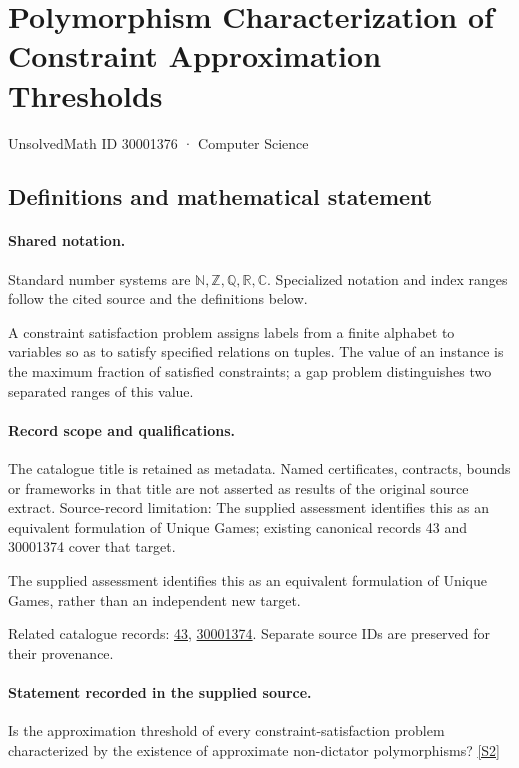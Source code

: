 \documentclass[11pt]{article}
\newcommand{\sref}[2]{\hyperlink{source:#1:#2}{[S#2]}}
\begin{document}
\setcounter{section}{30001375}
\section{Polymorphism Characterization of Constraint Approximation Thresholds}\label{30001376}
{\small\sffamily UnsolvedMath ID 30001376 · Computer Science}
\subsection{Definitions and mathematical statement}

\paragraph{Shared notation.}Standard number systems are $\mathbb N,\mathbb Z,\mathbb Q,\mathbb R,\mathbb C$. Specialized notation and index ranges follow the cited source and the definitions below.


A constraint satisfaction problem assigns labels from a finite alphabet to variables so as to satisfy specified relations on tuples. The value of an instance is the maximum fraction of satisfied constraints; a gap problem distinguishes two separated ranges of this value.
\paragraph{Record scope and qualifications.}
The catalogue title is retained as metadata. Named certificates, contracts, bounds or frameworks in that title are not asserted as results of the original source extract.
Source-record limitation: The supplied assessment identifies this as an equivalent formulation of Unique Games; existing canonical records 43 and 30001374 cover that target.

The supplied assessment identifies this as an equivalent formulation of Unique Games, rather than an independent new target.

Related catalogue records: \href{https://mehmetmars7.github.io/Erdosproblems-llm-hunter/problem.html?type=open_problems&id=43}{43}, \href{https://mehmetmars7.github.io/Erdosproblems-llm-hunter/problem.html?type=open_problems&id=30001374}{30001374}. Separate source IDs are preserved for their provenance.
\paragraph{Statement recorded in the supplied source.}
Is the approximation threshold of every constraint-satisfaction problem characterized by the existence of approximate non-dictator polymorphisms? \sref{30001376}{2}
\end{document}
